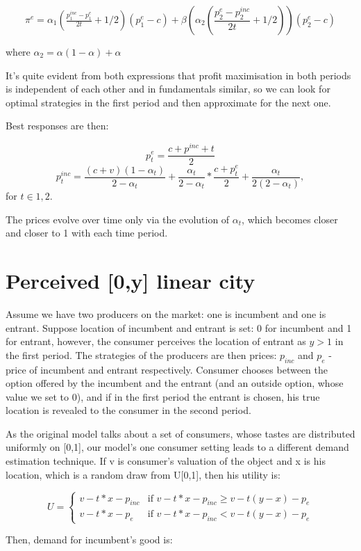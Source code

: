 \documentclass{article}
\begin{document}
 $$ \pi^{e} = \alpha_1(\tfrac{p^{inc}_1 - p^{e}_1}{2t} + 1/2)(p^{e}_1 -c) + \beta(\alpha_2(\frac{p^{e}_2 - p^{inc}_2}{2t} + 1/2))(p^{e}_2 -c)  $$

where $\alpha_2 = \alpha(1-\alpha)+\alpha$

It's quite evident from both expressions that profit maximisation in both periods is independent of each other and in fundamentals similar, so we can look for optimal strategies in the first period and then approximate for the next one.

Best responses are then:

$$ p^{e}_t = \frac{c+p^{inc}+t}{2}$$
$$ p^{inc}_t = \frac{(c+v)(1-\alpha_t)}{2-\alpha_t} + \frac{\alpha_t}{2-\alpha_t}*\frac{c+p_t^{e}}{2} + \frac{\alpha_t}{2(2-\alpha_t)}, $$
for $t \in {1,2}$.

The prices evolve over time only via the evolution of $\alpha_t$, which becomes closer and closer to 1 with each time period.

\section{Perceived [0,y] linear city}
Assume we have two producers on the market: one is incumbent and one is entrant. Suppose location of incumbent and entrant is set: 0 for incumbent and 1 for entrant, however, the consumer perceives the location of entrant as $y>1$ in the first period. The strategies of the producers are then prices: $p_{inc}$ and $p_{e}$ - price of incumbent and entrant respectively. Consumer chooses between the option offered by the incumbent and the entrant (and an outside option, whose value we set to 0), and if in the first period the entrant is chosen, his true location is revealed to the consumer in the second period.

As the original model talks about a set of consumers, whose tastes are distributed uniformly on [0,1], our model's one consumer setting leads to a different demand estimation technique. If v is consumer's valuation of the object and x is his location, which is a random draw from U[0,1], then his utility is:

    $$ U = \begin{cases}
    v - t*x - p_{inc} &  \text{if } v-t*x - p_{inc} \geq v - t(y-x) - p_{e}\\
    v - t*x - p_{e} &  \text{if } v-t*x - p_{inc} < v - t(y-x) - p_{e}
    \end{cases}
$$

Then, demand for incumbent's good is:
\end{document}
